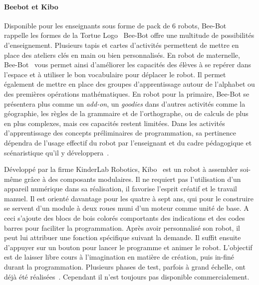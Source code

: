         \paragraph{Beebot et Kibo}\label{sec:BeeBot}
            Disponible pour les enseignants sous forme de pack de 6 robots, Bee-Bot~ rappelle les formes de la Tortue Logo~
            Bee-Bot offre une multitude de possibilités d'enseignement. Plusieurs tapis et cartes d'activités permettent de mettre en place des ateliers clés en main ou bien personnalisés. 
            En robot de maternelle, Bee-Bot~ vous permet ainsi d'améliorer les capacités des élèves à se repérer dans l'espace et à utiliser le bon vocabulaire pour déplacer le robot. Il permet également de mettre en place des groupes d'apprentissage autour de l'alphabet ou des premières opérations mathématiques.
            En robot pour la primaire, Bee-Bot se présentera plus comme un \textit{add-on}, un \textit{goodies} dans d'autres activités comme la géographie, les règles de la grammaire et de l'orthographe, ou de calculs de plus en plus complexes, mais ces capacités restent limitées. Dans les activités d'apprentissage des concepts préliminaires de programmation, sa pertinence dépendra de l'usage effectif du robot par l'enseignant et du cadre pédagogique et scénaristique qu'il y développera~.\par%
            Développé par la firme KinderLab Robotics, Kibo~ est un robot à assembler soi-même grâce à des composants modulaires. Il ne requiert pas l’utilisation d’un appareil numérique dans sa réalisation, il favorise l'esprit créatif et le travail manuel. 
            Il est orienté davantage pour les quatre à sept ans,  qui pour le construire se servent d’un module à deux roues muni d’un moteur comme unité de base. A ceci s’ajoute des blocs de bois colorés comportants des indications et des codes barres pour faciliter la programmation. Après avoir personnalisé son robot, il peut lui attribuer une fonction spécifique suivant la demande. Il suffit ensuite d’appuyer sur un bouton pour lancer le programme et animer le robot.
            L'objectif est de laisser libre cours à l'imagination en matière de création, puis in-finé durant la programmation.  Plusieurs phases de test, parfois à grand échelle, ont déjà été réalisées~. Cependant il n'est toujours pas disponible commercialement.
